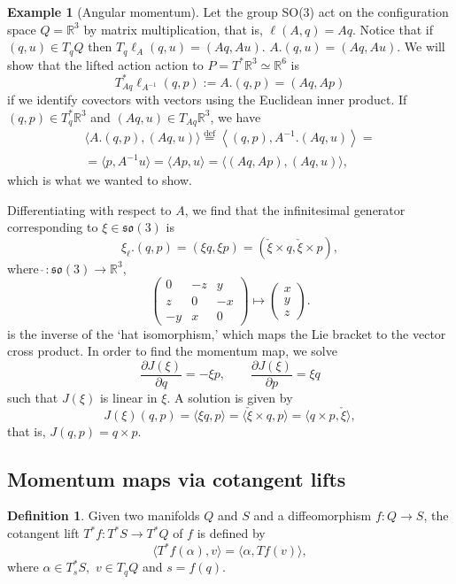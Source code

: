 \documentclass[a5paper,10pt,twoside]{article}
\newcommand{\R}{\ensuremath{\mathbb{R}}}
\newcommand{\eqdef}{\ensuremath{\overset{\mathrm{def}}{=}}}
\theoremstyle{plain}
\theoremstyle{definition}
\newtheorem{defn}[teo]{Definition}
\newtheorem{exam}[teo]{Example}
\theoremstyle{remark}
\begin{document}
\begin{exam}[Angular momentum]
Let the group SO($3$) act on the configuration space $Q=\R^3$ by matrix multiplication, that is, $\ell(A,q)=Aq.$ Notice that if $(q,u)\in T_q Q$ then $T_q\ell_A(q,u)=(Aq,Au)$.  $A.(q,u)=(Aq,Au).$ We will show that the lifted action action to $P=T^*\R^3\simeq \R^6$ is 
%
\begin{equation}
T_{Aq}^*\ell_{A^{-1}}(q,p) :=A.(q,p)= (Aq,Ap)
\end{equation}
%
if we identify covectors with vectors using the Euclidean inner product. If $(q,p)\in T^*_q\R^3$ and $(Aq,u)\in  T_{Aq}\R^3$, we have  
%
\begin{multline}
\langle  A.(q,p), (Aq,u)\rangle
\eqdef \left\langle (q,p),A^{-1}.(Aq,u)\right\rangle =\\
= \langle p,A^{-1}u\rangle = \langle Ap,u\rangle = \langle (Aq,Ap),(Aq,u)\rangle,
\end{multline}
%
which is what we wanted to show.

Differentiating with respect to $A$, we find that the infinitesimal generator corresponding to $\xi\in\mathfrak{so}(3)$ is
%
\begin{equation} 
\xi_\ell. (q,p)=(\xi q,\xi p)=(\check{\xi}\times q,\check{\xi}\times p),
\end{equation}
%
where $\check{\ }:\mathfrak{so}(3)\to\R^3$, 
$$
\begin{pmatrix}
0 & -z &y\\
z & 0 & -x\\
-y & x & 0
\end{pmatrix}
\mapsto
\begin{pmatrix}x\\y\\z\end{pmatrix}.
$$ 
is the inverse of the `hat isomorphism,'  which maps the Lie bracket to the vector cross product.  In order to find the momentum map, we solve
%
\begin{equation}
\frac{\partial J(\xi)}{\partial q}=-\xi p,\qquad \frac{\partial J(\xi)}{\partial p}=\xi q
\end{equation}
%
such that $J(\xi)$ is linear in $\xi$. A solution is given by
%
\begin{equation}
J(\xi)(q,p)=\langle \xi q,p\rangle = \langle \check{\xi}\times q,p\rangle = \langle q\times p,\check{\xi}\rangle,
\end{equation}
%
that is, $J(q,p)=q\times p.$
\end{exam}

\subsection{Momentum maps via cotangent lifts	}
\begin{defn}
Given two manifolds $Q$ and $S$ and a diffeomorphism $f:Q\to S$, the cotangent lift $T^*f:T^*S\to T^*Q$ of $f$ is defined by
$$
\langle T^*f(\alpha),v\rangle = \langle \alpha,Tf(v)\rangle,
$$
where $\alpha\in T_s^*S,$ $v\in T_qQ$ and $s=f(q)$.
\end{defn}
\end{document}
